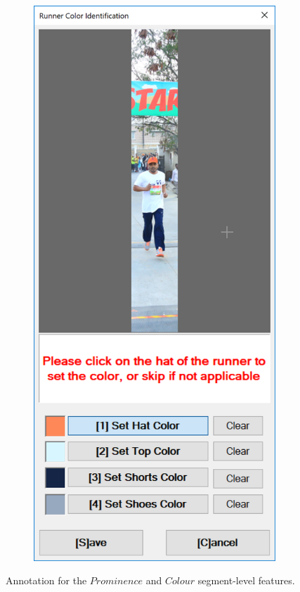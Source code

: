 \begin{figure}
\begin{subfigure}[b]{0.45\textwidth}
  \end{subfigure}
  \hspace{\fill}
  \begin{subfigure}[b]{0.45\textwidth}
    \includegraphics[width=\textwidth]{images/dataset/argus/argus_color_entry}
  \end{subfigure}
  \hspace{\fill}
  \caption[Prominence and Colour feature annotation with Argus]{Annotation for the $Prominence$ and $Colour$ segment-level features.}
  \label{fig:dataset:argus:prom_and_col}
\end{figure}

